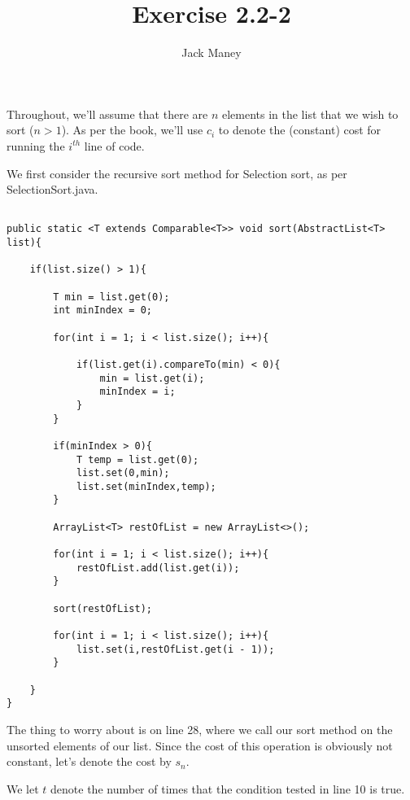\documentclass{article}
\begin{document}
\title{Exercise 2.2-2}
\author{Jack Maney}
\maketitle

Throughout, we'll assume that there are $n$ elements in the list that we wish to sort ($n>1$). As per the book, we'll use $c_i$ to denote the (constant) cost for running the $i^{th}$ line of code.

We first consider the recursive sort method for Selection sort, as per SelectionSort.java. 

\begin{verbatim}

public static <T extends Comparable<T>> void sort(AbstractList<T> list){
		
	if(list.size() > 1){
		
		T min = list.get(0);
		int minIndex = 0;
		
		for(int i = 1; i < list.size(); i++){
			
			if(list.get(i).compareTo(min) < 0){
				min = list.get(i);
				minIndex = i;
			}
		}
		
		if(minIndex > 0){
			T temp = list.get(0);
			list.set(0,min);
			list.set(minIndex,temp);
		}
		
		ArrayList<T> restOfList = new ArrayList<>();
		
		for(int i = 1; i < list.size(); i++){
			restOfList.add(list.get(i));
		}
		
		sort(restOfList);
		
		for(int i = 1; i < list.size(); i++){
			list.set(i,restOfList.get(i - 1));
		}
		
	}
}

\end{verbatim}

The thing to worry about is on line 28, where we call our sort method on the unsorted elements of our list. Since the cost of this operation is obviously not constant, let's denote the cost by $s_n$.

We let $t$ denote the number of times that the condition tested in line 10 is true.

\bigskip
\end{document}
